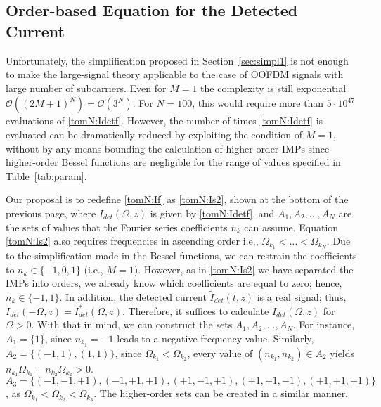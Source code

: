 \documentclass[journal]{IEEEtran}
\begin{document}
\subsection{Order-based Equation for the Detected Current}
Unfortunately, the simplification proposed in Section~\ref{sec:simpl1} is not enough to make the large-signal theory applicable to the case of OOFDM signals with large number of subcarriers. Even for $M = 1$ the complexity is still exponential $\mathcal{O}((2M + 1)^N) = \mathcal{O}(3^N)$. For $N = 100$, this would require more than $5\cdot10^{47}$ evaluations of \eqref{tomN:Idetf}. However, the number of times \eqref{tomN:Idetf} is evaluated can be dramatically reduced by exploiting the condition of $M = 1$, without by any means bounding the calculation of higher-order IMPs since higher-order Bessel functions are negligible for the range of values specified in Table~\ref{tab:param}.

Our proposal is to redefine \eqref{tomN:If} as \eqref{tomN:Is2}, shown at the bottom of the previous page, where $I_{det}(\Omega,z)$ is given by \eqref{tomN:Idetf}, and $A_1, A_2,\ldots, A_N$ are the sets of values that the Fourier series coefficients $n_k$ can assume. Equation \eqref{tomN:Is2} also requires frequencies in ascending order i.e., $\Omega_{k_1} <\ldots < \Omega_{k_N}$. Due to the simplification made in the Bessel functions, we can restrain the coefficients to $n_k\in\{-1,0,1\}$ (i.e., $M = 1$). However, as in \eqref{tomN:Is2} we have separated the IMPs into orders, we already know which coefficients are equal to zero; hence, $n_k\in\{-1,1\}$. In addition, the detected current $\tilde{I}_{det}(t,z)$ is a real signal; thus, $I_{det}(-\Omega,z) = I_{det}^*(\Omega,z)$. Therefore, it suffices to calculate $I_{det}(\Omega,z)$ for $\Omega > 0$. With that in mind, we can construct the sets $A_1, A_2,\ldots, A_N$. For instance, $A_1 = \{1\}$, since $n_{k_1} = -1$ leads to a negative frequency value. Similarly, $A_2 = \{(-1, 1), (1, 1)\}$, since $\Omega_{k_1} < \Omega_{k_2}$, every value of $(n_{k_1}, n_{k_2}) \in A_2$ yields $n_{k_1}\Omega_{k_1}+n_{k_2}\Omega_{k_2} > 0$. 
$A_3 = \{(-1, -1, +1), (-1, +1, +1), (+1, -1, +1), (+1, +1, -1),\allowbreak (+1, +1, +1)\}$, as $\Omega_{k_1} < \Omega_{k_2} < \Omega_{k_3}$. The higher-order sets can be created in a similar manner.
\end{document}
